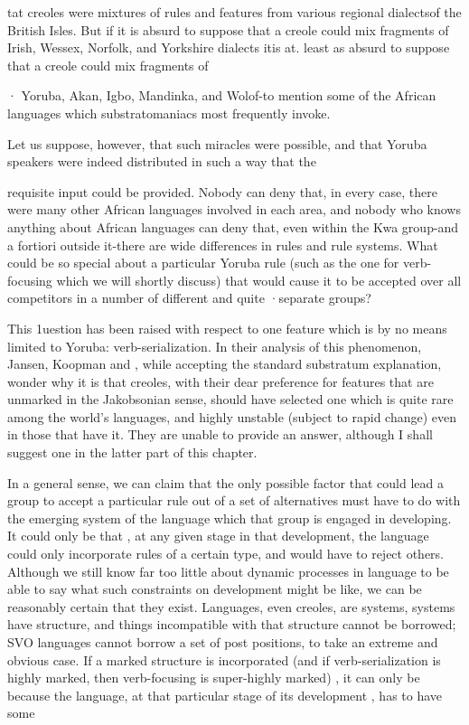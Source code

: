 tat creoles were mixtures of rules and features from various regional dialectsof the British Isles. But if it is absurd to suppose that a creole could mix fragments of Irish, Wessex, Norfolk, and Yorkshire dialects itis at. least as absurd to suppose that a creole could mix fragments of

· Yoruba, Akan, Igbo, Mandinka, and Wolof-to mention some of the African languages which substratomaniacs most frequently invoke.

Let us suppose, however, that such miracles were possible, and that Yoruba speakers were indeed distributed in such a way that the


requisite input could be provided. Nobody can deny that, in every case, there were many other African languages involved in each area, and nobody who knows anything about African languages can deny that, even within the Kwa group-and a fortiori outside it-there are wide differences in rules and rule systems. What could be so special about a particular Yoruba rule (such as the one for verb-focusing which we will shortly discuss) that would cause it to be accepted over all compe\-titors in a number of different and quite ·separate groups?

This 1uestion has been raised with respect to one feature which is by no means limited to Yoruba: verb-serialization. In their analysis of this phenomenon, Jansen, Koopman and \citet{Muysken1978}, while accepting the standard substratum explanation, wonder why it is that creoles, with their dear preference for features that are unmarked in the Jakobsonian sense, should have selected one which is quite rare among the world's languages, and highly unstable (subject to rapid change) even in those that have it. They are unable to provide an answer, although I shall suggest one in the latter part of this chapter.

In a general sense, we can claim that the only possible factor that could lead a group to accept a particular rule out of a set of alternatives must have to do with the emerging system of the language which that group is engaged in developing. It could only be that , at any given stage in that development, the language could only incorpor\-ate rules of a certain type, and would have to reject others. Although we still know far too little about dynamic processes in language to be able to say what such constraints on development might be like, we can be reasonably certain that they exist. Languages, even creoles, are systems, systems have structure, and things incompatible with that structure cannot be borrowed; SVO languages cannot borrow a set of post positions, to take an extreme and obvious case. If a marked struc\-ture is incorporated (and if verb-serialization is highly marked, then verb-focusing is super-highly marked) , it can only be because the language, at that particular stage of its development , has to have some

